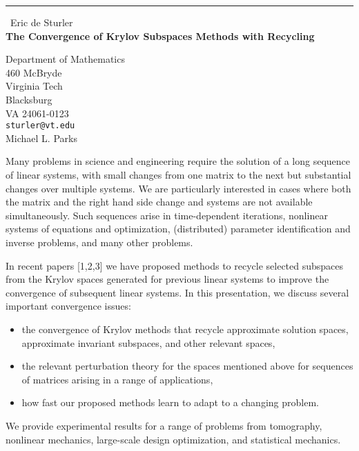 \documentclass{report}
\begin{document}
\begin{center}
\rule{6in}{1pt} \
{\large Eric de Sturler \\
{\bf The Convergence of Krylov Subspaces Methods with Recycling}}

Department of Mathematics \\ 460 McBryde \\ Virginia Tech \\ Blacksburg \\ VA 24061-0123
\\
{\tt sturler@vt.edu}\\
Michael L. Parks\end{center}

Many problems in science and engineering require the solution of a long
sequence of linear systems, with small changes from one matrix to the
next but substantial changes over multiple systems. We are particularly
interested in cases where both the matrix and the right hand side change
and systems are not available simultaneously. Such sequences arise in
time-dependent iterations, nonlinear systems of equations and
optimization, (distributed) parameter identification
and inverse problems, and many other problems.

In recent papers [1,2,3] we have
proposed methods to recycle selected subspaces from the Krylov
spaces generated for previous linear systems to improve the
convergence of subsequent linear systems. In this presentation, we
discuss several important convergence issues:
\begin{itemize}
\item the convergence of Krylov methods that recycle approximate
solution spaces, approximate invariant subspaces, and other relevant spaces,

\item the relevant perturbation theory for the spaces mentioned above for
sequences of matrices arising in a range of applications,

\item how fast our proposed methods learn to adapt to a changing
problem.
\end{itemize}
We provide experimental results for a range of problems from
tomography, nonlinear mechanics, large-scale design optimization, and
statistical mechanics.
\end{document}
